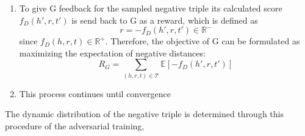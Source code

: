 \begin{enumerate}
    \item 
    To give G feedback for the sampled negative triple  its calculated score $f_D(h',r,t')$ is send back to G as a reward, which is defined as
    \begin{equation}
        r = -f_D(h',r,t') \in \mathbb{R}^-
    \end{equation}
    since $f_D(h,r,t) \in \mathbb{R}^+$.
    Therefore, the objective of G can be formulated as maximizing the expectation of negative distances:
    \begin{equation}
        R_G=\sum_{(h,r,t)\in\mathcal{T}}\mathbb{E}[-f_D(h',r,t')]
    \end{equation}
    
    \item
    This process continues until convergence
\end{enumerate}
The dynamic distribution of the negative triple is determined through this procedure of the adversarial training, 





